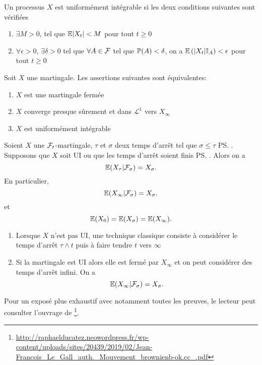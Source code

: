 \begin{definition}\label{def:UI}
Un processus $X$ est uniformément intégrable si les deux conditions suivantes sont vérifiées
\begin{enumerate}
    \item $\exists M> 0$, tel que $\mathbb{E}|X_t|<M$ pour tout $t\geq 0$
    \item $\forall \epsilon> 0$, $\exists \delta> 0$ tel que $\forall A\in\mathcal{F}$ tel que $\mathbb{P}(A)<\delta$, on a $\mathbb{E}\left(|X_t|\mathbb{I}_A\right)<\epsilon$ pour tout $t\geq $0
\end{enumerate}
\end{definition}
\begin{theo}\label{theo:martingale_convergence}
Soit $X$ une martingale. Les assertions suivantes sont équivalentes:
\begin{enumerate}
    \item $X$ est une martingale fermée
    \item $X$ converge presque sûrement et dans $\mathcal{L}^1$ vers $X_\infty$
    \item $X$ est uniformément intégrable
\end{enumerate}
\end{theo}
\begin{theo}\label{theo:doob_stopping_theorem}
Soient $X$ une $\mathcal{F}_t$-martingale, $\tau$ et $\sigma$ deux temps d'arrêt tel que $\sigma\leq \tau$ \ps. Supposons que $X$ soit UI ou que les temps d'arrêt soient finis \ps. Alors on a 
$$
\mathbb{E}(X_{\tau}|\mathcal{F}_\sigma) = X_\sigma.
$$
En particulier, 
$$
\mathbb{E}(X_{\infty}|\mathcal{F}_\sigma) = X_\sigma.
$$
et 
$$
\mathbb{E}(X_0) = \mathbb{E}(X_{\sigma}) =\mathbb{E}(X_{\infty}).
$$
\end{theo}
\begin{remark}

\begin{enumerate}
    \item Lorsque $X$ n'est pas UI, une technique classique consiste à considérer le temps d'arrêt $\tau\land t$ puis à faire tendre $t$ vers $\infty$
    \item Si la martingale est UI alors elle est fermé par $X_\infty$ et on peut considérer des temps d'arrêt infini. On a 
    $$
    \mathbb{E}(X_\infty|\mathcal{F}_\sigma) = X_\sigma.
    $$
\end{enumerate}
\end{remark}
Pour un exposé plus exhaustif avec notamment toutes les preuves, le lecteur peut consulter l'ouvrage de \citet[Chapitre 3]{Gall2012}\footnote{\url{http://raphaelducatez.neowordpress.fr/wp-content/uploads/sites/20439/2019/02/Jean-Francois_Le_Gall_auth._Mouvement_brownienb-ok.cc_.pdf}}.
